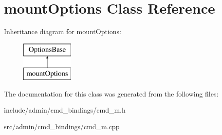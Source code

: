 \hypertarget{classmountOptions}{\section{mount\-Options \-Class \-Reference}
\label{da/db5/classmountOptions}
}
\-Inheritance diagram for mount\-Options\-:\begin{figure}[H]
\begin{center}
\leavevmode
\includegraphics[height=2.000000cm]{da/db5/classmountOptions}
\end{center}
\end{figure}


\-The documentation for this class was generated from the following files\-:\begin{DoxyCompactItemize}
\item 
include/admin/cmd\-\_\-bindings/cmd\-\_\-m.\-h\item 
src/admin/cmd\-\_\-bindings/cmd\-\_\-m.\-cpp\end{DoxyCompactItemize}
